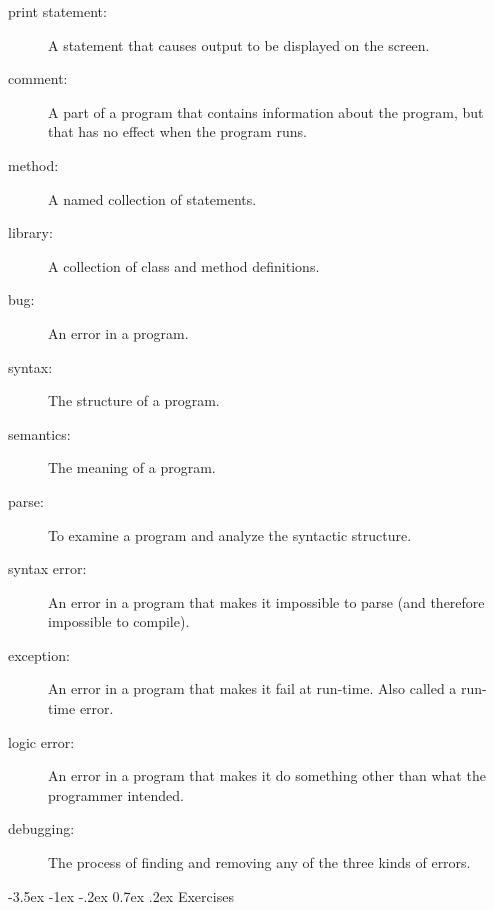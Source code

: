 \documentclass{book}
\makeatletter
\renewcommand{\section}{\@startsection 
    {section} {1} {0mm}%
    {-3.5ex \@plus -1ex \@minus -.2ex}%
    {0.7ex \@plus.2ex}%
    {\normalfont\Large\bfseries}}
\makeatother
\begin{document}
\begin{description}
\item[print statement:] A statement that
causes output to be displayed on the screen.

\item[comment:] A part of a program that contains information
about the program, but that has no effect when the program runs.

\item[method:] A named collection of statements.

\item[library:] A collection of class and method definitions.

\item[bug:]  An error in a program.

\item[syntax:]  The structure of a program.

\item[semantics:]  The meaning of a program.

\item[parse:]  To examine a program and analyze the syntactic structure.

\item[syntax error:]  An error in a program that makes it impossible
to parse (and therefore impossible to compile).

\item[exception:]  An error in a program that makes it fail at
run-time.  Also called a run-time error.

\item[logic error:]  An error in a program that makes it do something
other than what the programmer intended.

\item[debugging:]  The process of finding and removing any of
the three kinds of errors.


\end{description}

\section{Exercises}
\end{document}
